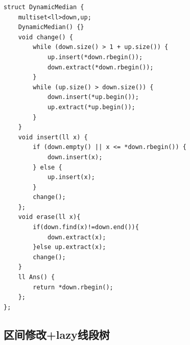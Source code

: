 \documentclass[a4paper,10pt]{article}
\begin{document}
\noindent\begin{lstlisting}
struct DynamicMedian {
    multiset<ll>down,up;
    DynamicMedian() {}
    void change() {
        while (down.size() > 1 + up.size()) {
            up.insert(*down.rbegin());
            down.extract(*down.rbegin());
        }
        while (up.size() > down.size()) {
            down.insert(*up.begin());
            up.extract(*up.begin());
        }
    }
    void insert(ll x) {
        if (down.empty() || x <= *down.rbegin()) {
            down.insert(x);
        } else {
            up.insert(x);
        }
        change();
    };
    void erase(ll x){
        if(down.find(x)!=down.end()){
            down.extract(x);
        }else up.extract(x);
        change();
    }
    ll Ans() {
        return *down.rbegin();
    };
};\end{lstlisting}

\subsection{区间修改+lazy线段树}
\thispagestyle{fancy}
\end{document}
